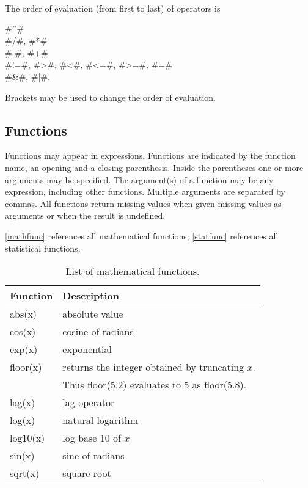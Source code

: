 The order of evaluation (from first to last) of operators is

#^# \\
#/#, #*#\\
#-#, #+#\\
#!=#, #>#, #<#, #<=#, #>=#, #=#\\
#&#, #|#.

Brackets may be used to change the order of evaluation.


\subsection{Functions}

Functions may appear in expressions. Functions are indicated by
the function name, an opening and a closing parenthesis. Inside
the parentheses one or more arguments may be specified. The
argument(s) of a function may be any expression, including other
functions. Multiple arguments are separated by commas. All
functions return missing values when given missing values as
arguments or when the result is undefined.

\autoref{mathfunc} references all mathematical functions;
\autoref{statfunc} references all statistical functions.
  
 
 
   


\begin{table}[ht]
\begin{center}
\begin{tabular}{|l|l|}
\hline
{\bf Function} & {\bf Description} \\
\hline \hline
abs(x) & absolute value \\
cos(x) & cosine of radians \\
exp(x) & exponential \\
floor(x) & returns the integer obtained by truncating $x$. \\
& Thus floor(5.2) evaluates to 5 as floor(5.8). \\
lag(x) & lag operator \\
log(x) & natural logarithm \\
log10(x) & log base 10 of $x$ \\
sin(x) & sine of radians \\
sqrt(x) & square root \\
\hline
\end{tabular}
{\em\caption{\label{mathfunc} List of mathematical functions.}}
\end{center}
\end{table}




